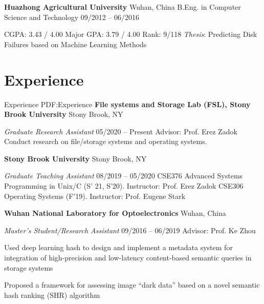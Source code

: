 \documentclass[letterpaper,10pt,oneside]{article}
\begin{document}
\begin{body}
\BigGap
{\textbf{Huazhong Agricultural University}}
\hfill
Wuhan, China
\GapNoBreak
\BulletItem
B.Eng. in
{Computer Science and Technology}
\hfill
09/2012 -- 06/2016
\begin{detail}

\BulletItem
CGPA: 3.43 / 4.00 \quad Major GPA: 3.79 / 4.00 \quad Rank: 9/118
\BulletItem
\emph{Thesis}: Predicting Disk Failures based on Machine Learning Methods
\end{detail}


\section
{Experience}
{Experience}
{PDF:Experience}
{\textbf{File systems and Storage Lab (FSL), Stony Brook University}}
\hfill
Stony Brook, NY

\emph{Graduate Research Assistant}
\hfill
05/2020 --
Present
\GapNoBreak
Advisor: Prof. Erez Zadok
\BulletItem
Conduct research on file/storage systems and operating systems.

\BigGap
{\textbf{Stony Brook University}}
\hfill
Stony Brook, NY

\emph{Graduate Teaching Assistant}
\hfill
08/2019 --
05/2020
\GapNoBreak
\BulletItem
CSE376 Advanced Systems Programming in Unix/C (S' 21, S'20). Instructor: Prof. Erez Zadok
\BulletItem
CSE306 Operating Systems (F'19). Instructor: Prof. Eugene Stark


\BigGap
{\textbf{Wuhan National Laboratory for Optoelectronics}}
\hfill
Wuhan, China

\emph{Master's Student/Research Assistant}
\hfill
09/2016 --
06/2019
\GapNoBreak
Advisor: Prof. Ke Zhou

\GapNoBreak
\BulletItem
Used deep learning hash to design and implement a metadata system for integration of high-precision and low-latency content-based semantic queries in storage systems

\GapNoBreak
\BulletItem
Proposed a framework for assessing image ``dark data'' based on a novel semantic hash ranking (SHR) algorithm


\end{body}
\end{document}
